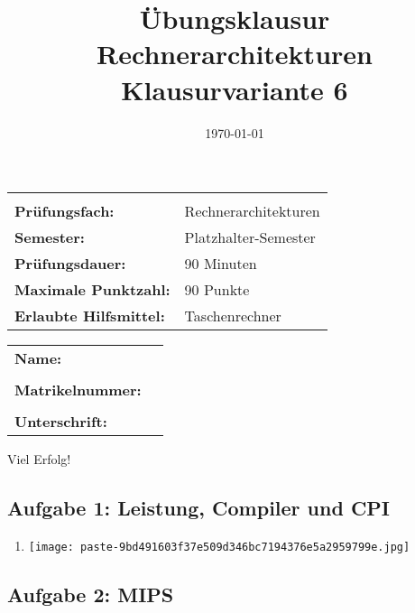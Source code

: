 \documentclass[12pt,a4paper]{article}
\title{Übungsklausur Rechnerarchitekturen \\ \large Klausurvariante 6}
\author{}
\date{\today}
\begin{document}
\begin{titlepage}
    \maketitle
    \vspace{0.5cm}
    \centering
    \begin{tabularx}{0.9\textwidth}{lX}
        \hline\hline \\
        \textbf{Prüfungsfach:} & Rechnerarchitekturen \\
        \textbf{Semester:} & Platzhalter-Semester \\
        \textbf{Prüfungsdauer:} & 90 Minuten \\
        \textbf{Maximale Punktzahl:} & 90 Punkte \\
        \textbf{Erlaubte Hilfsmittel:} & Taschenrechner \\
        \hline\hline
    \end{tabularx}
    \vspace{2.5cm}
    \begin{tabularx}{0.9\textwidth}{lX}
        \textbf{Name:} & \dotfill \\
        \\
        \textbf{Matrikelnummer:} & \dotfill \\
        \\
        \textbf{Unterschrift:} & \dotfill \\
    \end{tabularx}
    \vfill
    {\Large Viel Erfolg!}
\end{titlepage}
\clearpage
\subsection*{Aufgabe 1: Leistung, Compiler und CPI}

\begin{enumerate}[label=\alph*), topsep=5pt, itemsep=10pt]
\item \mbox{}\begin{center}\texttt{[image: paste-9bd491603f37e509d346bc7194376e5a2959799e.jpg]}
\end{center}
\end{enumerate}
\clearpage
\subsection*{Aufgabe 2: MIPS}
\end{document}
